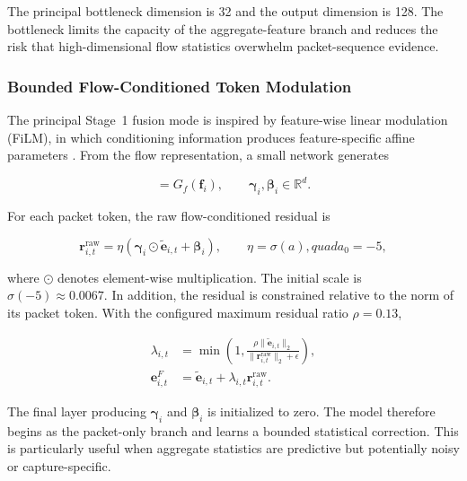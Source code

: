 The principal bottleneck dimension is 32 and the output dimension is 128. The
bottleneck limits the capacity of the aggregate-feature branch and reduces the
risk that high-dimensional flow statistics overwhelm packet-sequence evidence.

\subsubsection{Bounded Flow-Conditioned Token Modulation}
\label{subsubsec:token_film}

The principal Stage~1 fusion mode is inspired by feature-wise linear modulation
(FiLM), in which conditioning information produces feature-specific affine
parameters \cite{Perez2018FiLM}. From the flow representation, a small network
generates

\begin{equation}
    [\boldsymbol{\gamma}_i;\boldsymbol{\beta}_i]
    =G_f(\mathbf{f}_i),
    \qquad
    \boldsymbol{\gamma}_i,\boldsymbol{\beta}_i\in\mathbb{R}^{d}.
    \label{eq:film_parameters}
\end{equation}

For each packet token, the raw flow-conditioned residual is

\begin{equation}
    \mathbf{r}^{\mathrm{raw}}_{i,t}
    =\eta
    \left(
        \boldsymbol{\gamma}_i\odot\widetilde{\mathbf{e}}_{i,t}
        +\boldsymbol{\beta}_i
    \right),
    \qquad
    \eta=\sigma(a),quad a_{0}=-5,
    \label{eq:film_raw_residual}
\end{equation}

where $\odot$ denotes element-wise multiplication. The initial scale is
$\sigma(-5)\approx0.0067$. In addition, the residual is constrained relative
to the norm of its packet token. With the configured maximum residual ratio
$\rho=0.13$,

\begin{align}
    \lambda_{i,t}
    &=\min\left(
        1,
        \frac{\rho\|\widetilde{\mathbf{e}}_{i,t}\|_2}
             {\|\mathbf{r}^{\mathrm{raw}}_{i,t}\|_2+\epsilon}
      \right),\\
    \mathbf{e}^{F}_{i,t}
    &=\widetilde{\mathbf{e}}_{i,t}
      +\lambda_{i,t}\mathbf{r}^{\mathrm{raw}}_{i,t}.
    \label{eq:bounded_token_film}
\end{align}

The final layer producing $\boldsymbol{\gamma}_i$ and
$\boldsymbol{\beta}_i$ is initialized to zero. The model therefore begins as
the packet-only branch and learns a bounded statistical correction. This is
particularly useful when aggregate statistics are predictive but potentially
noisy or capture-specific.

